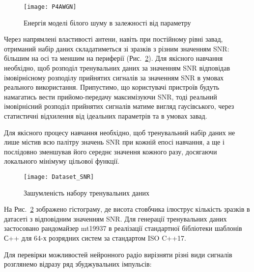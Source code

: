 \begin{figure}[htbp] \begin{center}
\texttt{[image: P4AWGN]}
\caption{Енергія моделі білого шуму в залежності від параметру} \label{fig:P4AWGN}
\end{center} \end{figure}

Через напрямлені властивості антени, навіть при постійному рівні завад, 
отриманий набір даних складатиметься зі зразків з різним значенням SNR: більшим 
на осі та меншим на периферії (Рис.~\ref{fig:SNR}). Для якісного навчання 
необхідно, щоб розподіл тренувальних даних за значенням SNR відповідав 
імовірнісному розподілу прийнятих сигналів за значенням SNR в умовах 
реального використання. Припустимо, що користувачі пристроїв будуть 
намагатись вести прийомо-передачу максимізуючи SNR, тоді реальний імовірнісний 
розподіл прийнятих сигналів матиме вигляд гаусівського, через статистичні 
відхилення від ідеальних параметрів та в умовах завад.

Для якісного процесу навчання необхідно, щоб тренувальний набір даних не 
лише містив всю палітру значень SNR при кожній епосі навчання, а ще і 
послідовно зменшував його середнє значення кожного разу, досягаючи 
локального мінімуму цільової функції.

\begin{figure}[htbp] \begin{center}
\texttt{[image: Dataset\_SNR]}
\caption{Зашумленість набору тренувальних даних} \label{fig:SNR}
\end{center} \end{figure}

На Рис.~\ref{fig:SNR} зображено гістограму, де висота стовбчика ілюструє 
кількість зразків в датасеті з відповідним значенням SNR. Для генерації 
тренувальних даних застосовано рандомайзер mt19937 в реалізації стандартної
бібліотеки шаблонів С++ для 64-х розрядних систем за стандартом ISO C++17.

Для перевірки можливостей нейронного радіо вирізняти різні види сигналів 
розглянемо відразу ряд збуджувальних імпульсів:

